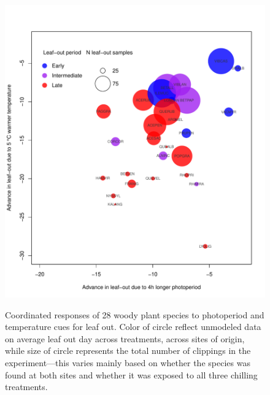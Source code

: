 \documentclass{article}
\begin{document}
\clearpage 


\begin{figure} 
\begin{center}
\caption{Coordinated responses of 28 woody plant species to photoperiod and temperature cues for leaf out. Color of circle reflect unmodeled data on average leaf out day across treatments, across sites of origin, while size of circle represents the total number of clippings in the experiment---this varies mainly based on whether the species was found at both sites and whether it was exposed to all three chilling treatments. } %
\includegraphics[scale=0.5]{Advplot2}
\label{fig1}
\end{center}
\end{figure}
\end{document}
